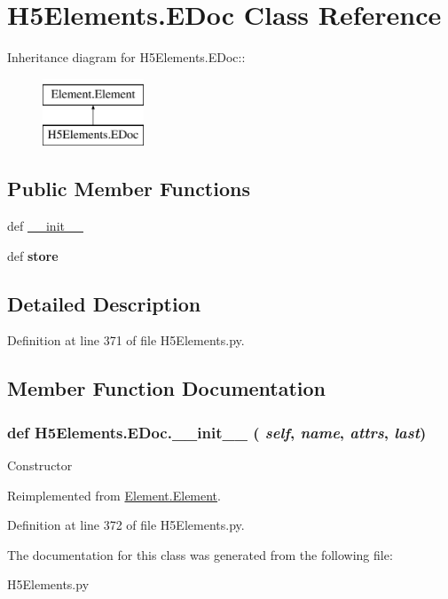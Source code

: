 \hypertarget{classH5Elements_1_1EDoc}{
\section{H5Elements.EDoc Class Reference}
\label{classH5Elements_1_1EDoc}
}
Inheritance diagram for H5Elements.EDoc::\begin{figure}[H]
\begin{center}
\leavevmode
\includegraphics[height=2cm]{classH5Elements_1_1EDoc}
\end{center}
\end{figure}
\subsection*{Public Member Functions}
\begin{DoxyCompactItemize}
\item 
def \hyperlink{classH5Elements_1_1EDoc_a1680abdb0cd1799968e6661a70d1d341}{\_\-\_\-init\_\-\_\-}
\item 
\hypertarget{classH5Elements_1_1EDoc_a4ab92a516cf1b5f99995cc35ddcfbcba}{
def {\bfseries store}}
\label{classH5Elements_1_1EDoc_a4ab92a516cf1b5f99995cc35ddcfbcba}

\end{DoxyCompactItemize}


\subsection{Detailed Description}


Definition at line 371 of file H5Elements.py.

\subsection{Member Function Documentation}
\hypertarget{classH5Elements_1_1EDoc_a1680abdb0cd1799968e6661a70d1d341}{
\subsubsection[{\_\-\_\-init\_\-\_\-}]{\setlength{\rightskip}{0pt plus 5cm}def H5Elements.EDoc.\_\-\_\-init\_\-\_\- ( {\em self}, \/   {\em name}, \/   {\em attrs}, \/   {\em last})}}
\label{classH5Elements_1_1EDoc_a1680abdb0cd1799968e6661a70d1d341}
\begin{DoxyVerb}Constructor \end{DoxyVerb}
 

Reimplemented from \hyperlink{classElement_1_1Element_a359371465b7c4d21611adec7e86c3b33}{Element.Element}.

Definition at line 372 of file H5Elements.py.

The documentation for this class was generated from the following file:\begin{DoxyCompactItemize}
\item 
H5Elements.py\end{DoxyCompactItemize}
